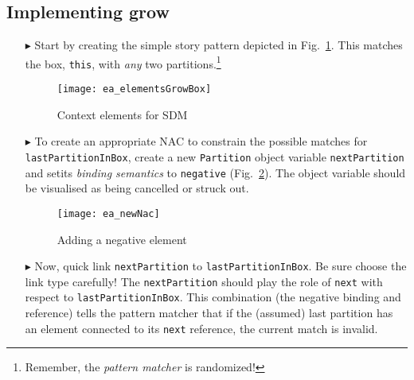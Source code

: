 \newpage
\hypertarget{growBox vis}{}
\subsection{Implementing grow}
\visHeader

\begin{itemize}
 
\item[$\blacktriangleright$] Start by creating the simple story pattern depicted in Fig.~\ref{fig:sdm_grow_1}. This matches the box, \texttt{this}, with
\emph{any} two partitions.\footnote{Remember, the \emph{pattern matcher} is randomized!}

\vspace{0.5cm}

\begin{figure}[htbp]
\begin{center}
  \texttt{[image: ea\_elementsGrowBox]}
  \caption{Context elements for SDM}  
  \label{fig:sdm_grow_1}
\end{center}
\end{figure}

\item[$\blacktriangleright$] To create an appropriate \mbox{NAC} to constrain the possible matches for \texttt{lastPartitionInBox},  create a new
\texttt{Partition} object variable \texttt{nextPartition} and setits \emph{binding semantics} to \texttt{negative}
(Fig.~\ref{fig:sdm_grow_2}). The object variable should be visualised as being cancelled or struck out. 
 
\begin{figure}[htbp]
\begin{center}
  \texttt{[image: ea\_newNac]}
  \caption{Adding a negative element}  
  \label{fig:sdm_grow_2}
\end{center}
\end{figure}
 
\item[$\blacktriangleright$] Now, quick link \texttt{nextPartition} to \texttt{lastPartitionInBox}. Be sure choose the link type carefully! The
\texttt{nextPartition} should play the role of \texttt{next} with respect to \texttt{lastPartitionInBox}. This combination (the negative binding and reference)
tells the pattern matcher that if the (assumed) last partition has an element connected to its \texttt{next} reference, the current match is invalid.


\end{itemize}
